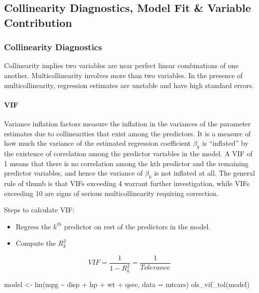 \documentclass[
]{article}
\newenvironment{Shaded}{\begin{snugshade}}{\end{snugshade}}
\newcommand{\AttributeTok}[1]{\textcolor[rgb]{0.77,0.63,0.00}{#1}}
\newcommand{\FunctionTok}[1]{\textcolor[rgb]{0.00,0.00,0.00}{#1}}
\newcommand{\NormalTok}[1]{#1}
\newcommand{\OtherTok}[1]{\textcolor[rgb]{0.56,0.35,0.01}{#1}}
\newcommand{\SpecialCharTok}[1]{\textcolor[rgb]{0.00,0.00,0.00}{#1}}
\providecommand{\tightlist}{%
  \setlength{\itemsep}{0pt}\setlength{\parskip}{0pt}}
\begin{document}
\hypertarget{collinearity-diagnostics-model-fit-variable-contribution}{%
\subsection{Collinearity Diagnostics, Model Fit \& Variable
Contribution}\label{collinearity-diagnostics-model-fit-variable-contribution}}

\hypertarget{collinearity-diagnostics-1}{%
\subsubsection{Collinearity
Diagnostics}\label{collinearity-diagnostics-1}}

Collinearity implies two variables are near perfect linear combinations
of one another. Multicollinearity involves more than two variables. In
the presence of multicollinearity, regression estimates are unstable and
have high standard errors.

\hypertarget{vif}{%
\paragraph{VIF}\label{vif}}

Variance inflation factors measure the inflation in the variances of the
parameter estimates due to collinearities that exist among the
predictors. It is a measure of how much the variance of the estimated
regression coefficient \(\beta_{k}\) is ``inflated'' by the existence of
correlation among the predictor variables in the model. A VIF of 1 means
that there is no correlation among the kth predictor and the remaining
predictor variables, and hence the variance of \(\beta_{k}\) is not
inflated at all. The general rule of thumb is that VIFs exceeding 4
warrant further investigation, while VIFs exceeding 10 are signs of
serious multicollinearity requiring correction.

Steps to calculate VIF:

\begin{itemize}
\tightlist
\item
  Regress the \(k^{th}\) predictor on rest of the predictors in the
  model.
\item
  Compute the \({R}^{2}_{k}\)
\end{itemize}

\[VIF = \frac{1}{1 - {R}^{2}_{k}} = \frac{1}{Tolerance}\]

\begin{Shaded}
\begin{Highlighting}[]
\NormalTok{model }\OtherTok{\textless{}{-}} \FunctionTok{lm}\NormalTok{(mpg }\SpecialCharTok{\textasciitilde{}}\NormalTok{ disp }\SpecialCharTok{+}\NormalTok{ hp }\SpecialCharTok{+}\NormalTok{ wt }\SpecialCharTok{+}\NormalTok{ qsec, }\AttributeTok{data =}\NormalTok{ mtcars)}
\FunctionTok{ols\_vif\_tol}\NormalTok{(model)}
\end{Highlighting}
\end{Shaded}
\end{document}
